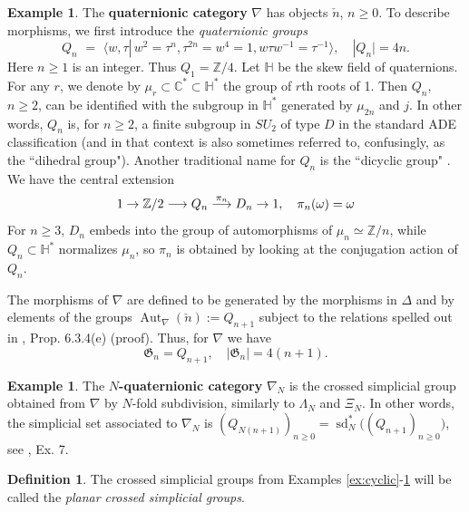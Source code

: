 \documentclass[english,11pt,leqno]{article}
\def\CC{\mathbb{C}}
\def\HH{\mathbb{H}}
\def\ZZ{\mathbb{Z}}
\def\Gen{\mathfrak{G}}
\def\Aut{\operatorname{Aut}\nolimits}
\def\on{\operatorname}
\def\lra{\longrightarrow}
\theoremstyle{definition}
\newtheorem{defi}[thm]{Definition}
\newtheorem{exa}[thm]{Example}
\theoremstyle{remark}
\numberwithin{equation}{section}
\begin{document}
\begin{exa}\label{ex:quaternionic}
The {\bf quaternionic category} $\nabla$ has objects $\check n$, $n\geq 0$.
To describe morphisms, we first introduce the {\em quaternionic groups}
\[
   Q_n  \,\,=\,\,  \langle w, \tau |\, w^2=\tau^n , \tau^{2n}=w^4=1, w\tau w^{-1} = \tau^{-1}\rangle,
   \quad |Q_n|=4n.
\]
    Here $n\geq 1$ is an integer.  Thus $Q_1=\ZZ/4$. Let $\HH$  be the skew field of quaternions.
    For any $r$, we denote by   $\mu_r \subset \CC^* \subset \HH^*$ the group of $r$th roots of 1.
    Then $Q_n$, $n\geq 2$, can be identified with the subgroup in $\HH^*$ generated by $\mu_{2n}$
    and $j$. In other words,   $Q_n$ is, for $n\geq 2$, a finite subgroup in $SU_2$ of type $D$ in
    the standard ADE classification (and in that context is also sometimes referred to, confusingly,
    as the ``dihedral group").  Another  traditional name for $Q_n$ is the {``dicyclic group"}
    \cite[\S 7.2]{coxeter}.  We have the central extension 
    \begin{equation}\label{eq:p_n} 1\to
	    \ZZ/2\lra Q_n\buildrel \pi_n \over \lra D_n\to 1, \quad \pi_n(\omega) = \omega
    \end{equation} 
    For $n\geq 3$, $D_n$ embeds into the group of automorphisms of $\mu_n\simeq
    \ZZ/n$, while $Q_n\subset\HH^*$ normalizes $\mu_n$, so $\pi_n$ is obtained by looking at the
    conjugation action of $Q_n$.

 The morphisms of $\nabla$ are defined to be generated by the morphisms in $\Delta$
 and by elements of the groups $\Aut_\nabla(\check n):=Q_{n+1}$ subject to the relations
 spelled out in \cite{loday}, Prop. 6.3.4(e) (proof). Thus, for $\nabla$ we have
 \[
 \Gen_n = Q_{n+1}, \quad |\Gen_n|= 4(n+1). 
 \]
 \end{exa}
 
 \begin{exa}\label{ex:N-quat}
  The {\bf $N$-quaternionic category} $\nabla_N$ is the crossed simplicial group
  obtained from $\nabla$ by $N$-fold subdivision, similarly to $\Lambda_N$
  and $\Xi_N$. In other words, the simplicial set associated to $\nabla_N$
  is $(Q_{N(n+1)})_{n\geq 0} = \on{sd}_N^*\bigl( (Q_{n+1})_{n\geq 0}\bigr)$,
  see \cite{fiedorowicz-loday}, Ex. 7. 
	
	 
	


\end{exa}


\begin{defi}   The crossed simplicial groups from Examples
\ref{ex:cyclic}-\ref{ex:N-quat} will be called the {\em planar crossed simplicial groups}. 
\end{defi}
\end{document}
